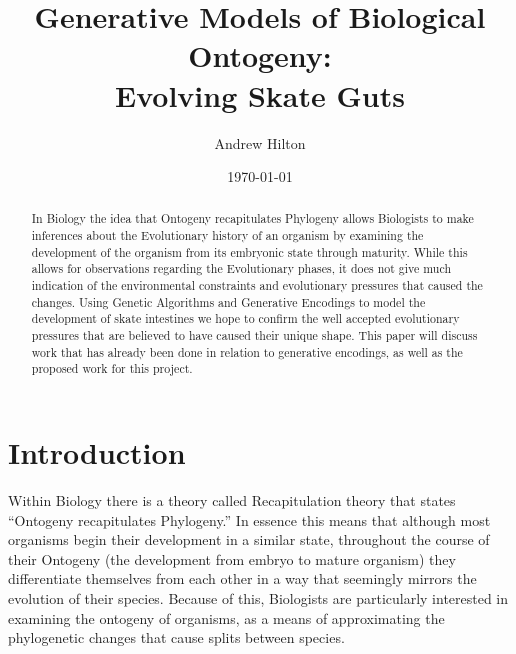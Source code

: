 \documentclass[condensed]{union-cs-thesis}
\begin{document}
\title{Generative Models of Biological Ontogeny:\\\Large Evolving Skate Guts}
\author{Andrew Hilton}
\date{\today}

\maketitle
\begin{abstract}
\makeabstract
In Biology the idea that Ontogeny recapitulates Phylogeny allows Biologists to make inferences about the
Evolutionary history of an organism by examining the development of the organism from its embryonic
state through maturity.  While this allows for observations regarding the Evolutionary phases, it does
not give much indication of the environmental constraints and evolutionary pressures that caused
the changes.  Using Genetic Algorithms and Generative Encodings to model the development of skate intestines
we hope to confirm the well accepted evolutionary pressures that are believed to have caused their
unique shape.  This paper will discuss work that has already been done in relation to generative
encodings, as well as the proposed work for this project.

\end{abstract}

\section{Introduction}

\par
Within Biology there is a theory called Recapitulation theory that states ``Ontogeny recapitulates
Phylogeny.''  In essence this means that although most organisms begin their development in a similar
state, throughout the course of their Ontogeny (the development from embryo to mature organism) they
differentiate themselves from each other in a way that seemingly mirrors the evolution of their species.
Because of this, Biologists are particularly interested in examining the ontogeny of organisms, as a
means of approximating the phylogenetic changes that cause splits between species.
\end{document}
